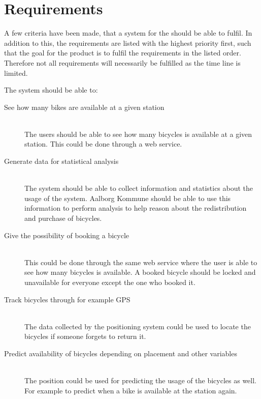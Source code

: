\section{Requirements}
A few criteria have been made, that a system for the \bycykel should be able to fulfil. 
In addition to this, the requirements are listed with the highest priority first, such that the goal for the product is to fulfil the requirements in the listed order. 
Therefore not all requirements will necessarily be fulfilled as the time line is limited.

The system should be able to:
\begin{description}
\item[See how many bikes are available at a given station] \hfill \\
The users should be able to see how many bicycles is available at a given station.
This could be done through a web service.
\item[Generate data for statistical analysis] \hfill \\
The system should be able to collect information and statistics about the usage of the system.
Aalborg Kommune should be able to use this information to perform analysis to help reason about the redistribution and purchase of bicycles.
\item[Give the possibility of booking a bicycle] \hfill \\
This could be done through the same web service where the user is able to see how many bicycles is available.
A booked bicycle should be locked and unavailable for everyone except the one who booked it.
\item[Track bicycles through for example GPS] \hfill \\
The data collected by the positioning system could be used to locate the bicycles if someone forgets to return it.
\item[Predict availability of bicycles depending on placement and other variables] \hfill \\
The position could be used for predicting the usage of the bicycles as well. 
For example to predict when a bike is available at the station again.
\end{description}